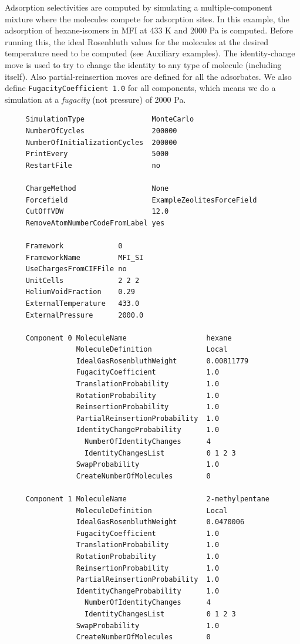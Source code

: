Adsorption selectivities are computed by simulating a multiple-component mixture where the molecules compete for adsorption sites.
In this example, the adsorption of hexane-isomers in MFI at 433 K and 2000 Pa is computed.
Before running this, the ideal Rosenbluth values for the molecules at the desired temperature need to be computed (see Auxiliary examples).
The identity-change move is used to try to change the identity to any type of molecule (including itself).
Also partial-reinsertion moves are defined for all the adsorbates.
We also define \verb+FugacityCoefficient 1.0+ for all components, which means we do a simulation at a \emph{fugacity} (not pressure) of 2000 Pa.
\begin{tiny}
\begin{verbatim}
     SimulationType                MonteCarlo
     NumberOfCycles                200000
     NumberOfInitializationCycles  200000
     PrintEvery                    5000
     RestartFile                   no
     
     ChargeMethod                  None
     Forcefield                    ExampleZeolitesForceField
     CutOffVDW                     12.0
     RemoveAtomNumberCodeFromLabel yes
     
     Framework             0
     FrameworkName         MFI_SI
     UseChargesFromCIFFile no
     UnitCells             2 2 2
     HeliumVoidFraction    0.29
     ExternalTemperature   433.0
     ExternalPressure      2000.0
     
     Component 0 MoleculeName                   hexane
                 MoleculeDefinition             Local
                 IdealGasRosenbluthWeight       0.00811779
                 FugacityCoefficient            1.0
                 TranslationProbability         1.0
                 RotationProbability            1.0
                 ReinsertionProbability         1.0
                 PartialReinsertionProbability  1.0
                 IdentityChangeProbability      1.0
                   NumberOfIdentityChanges      4
                   IdentityChangesList          0 1 2 3
                 SwapProbability                1.0
                 CreateNumberOfMolecules        0
     
     Component 1 MoleculeName                   2-methylpentane
                 MoleculeDefinition             Local
                 IdealGasRosenbluthWeight       0.0470006
                 FugacityCoefficient            1.0
                 TranslationProbability         1.0
                 RotationProbability            1.0
                 ReinsertionProbability         1.0
                 PartialReinsertionProbability  1.0
                 IdentityChangeProbability      1.0
                   NumberOfIdentityChanges      4
                   IdentityChangesList          0 1 2 3
                 SwapProbability                1.0
                 CreateNumberOfMolecules        0
     

\end{verbatim}
\end{tiny}
